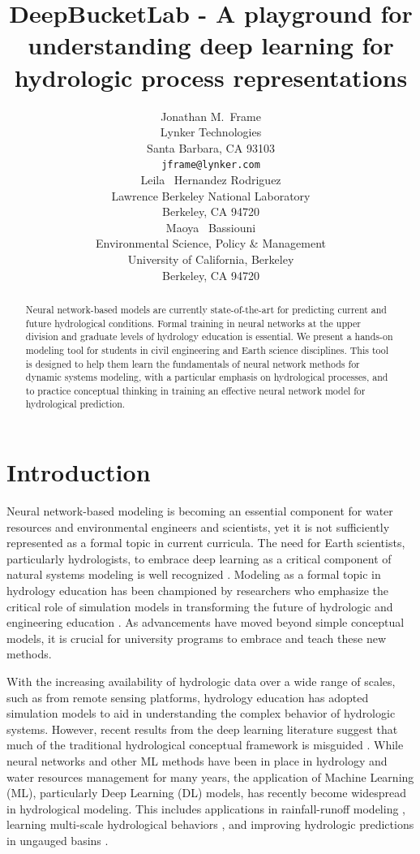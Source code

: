 \documentclass{article}
\title{DeepBucketLab - A playground for understanding deep learning for hydrologic process representations}
\author{ 
    Jonathan M.~Frame \\
	Lynker Technologies\\
	Santa Barbara, CA 93103 \\
	\texttt{jframe@lynker.com} \\
	\And
    Leila ~Hernandez Rodriguez\\
	Lawrence Berkeley National Laboratory\\
	Berkeley, CA 94720 \\
	\And
    Maoya ~Bassiouni \\
    Environmental Science, Policy & Management\\
	University of California, Berkeley\\
	Berkeley, CA 94720 \\
}
\begin{document}
\maketitle
\begin{abstract}
Neural network-based models are currently state-of-the-art for predicting current and future hydrological conditions. Formal training in neural networks at the upper division and graduate levels of hydrology education is essential. We present a hands-on modeling tool for students in civil engineering and Earth science disciplines. This tool is designed to help them learn the fundamentals of neural network methods for dynamic systems modeling, with a particular emphasis on hydrological processes, and to practice conceptual thinking in training an effective neural network model for hydrological prediction.
\end{abstract}


\section{Introduction}
Neural network-based modeling is becoming an essential component for water resources and environmental engineers and scientists, yet it is not sufficiently represented as a formal topic in current curricula. The need for Earth scientists, particularly hydrologists, to embrace deep learning as a critical component of natural systems modeling is well recognized \citep{nearing2021role}. Modeling as a formal topic in hydrology education has been championed by researchers who emphasize the critical role of simulation models in transforming the future of hydrologic and engineering education \citealp{aghakouchak2010application, aghakouchak2013educational}. As advancements have moved beyond simple conceptual models, it is crucial for university programs to embrace and teach these new methods.

With the increasing availability of hydrologic data over a wide range of scales, such as from remote sensing platforms, hydrology education has adopted simulation models to aid in understanding the complex behavior of hydrologic systems. However, recent results from the deep learning literature suggest that much of the traditional hydrological conceptual framework is misguided \citep{frame2023massbalance}. While neural networks and other ML methods have been in place in hydrology and water resources management for many years, the application of Machine Learning (ML), particularly Deep Learning (DL) models, has recently become widespread in hydrological modeling. This includes applications in rainfall-runoff modeling \citep{kratzert2018rainfall}, learning multi-scale hydrological behaviors \citep{kratzert2019towards}, and improving hydrologic predictions in ungauged basins \citep{kratzert2019towards}.
\end{document}
